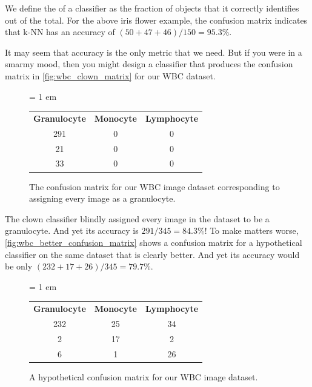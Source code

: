 \begin{note}\end{note}

We define the  of a classifier as the fraction of objects that it correctly identifies out of the total. For the above iris flower example, the confusion matrix indicates that k-NN has an accuracy of $(50 + 47 + 46)/150 = 95.3\%$.

It may seem that accuracy is the only metric that we need. But if you were in a smarmy mood, then you might design a classifier that produces the confusion matrix in \autoref{fig:wbc_clown_matrix} for our WBC dataset.\\

\begin{figure}[h]
\centering
\tabcolsep = 1 em
\mySfFamily
{}
\begin{tabular}{c c c}
\rowcolor{gray!50}
\textbf{Granulocyte} & \textbf{Monocyte} & \textbf{Lymphocyte} \\
291 & 0 & 0 \\
21 & 0 & 0 \\
33 & 0 & 0
\end{tabular}
\caption{The confusion matrix for our WBC image dataset corresponding to assigning every image as a granulocyte.}
\label{fig:wbc_clown_matrix}
\end{figure}

\begin{qbox}\end{qbox}

The clown classifier blindly assigned every image in the dataset to be a granulocyte. And yet its accuracy is $291/345 = 84.3\%$! To make matters worse, \autoref{fig:wbc_better_confusion_matrix} shows a confusion matrix for a hypothetical classifier on the same dataset that is clearly better. And yet its accuracy would be only $(232 + 17 + 26)/345 = 79.7\%$.\\

\begin{figure}[h]
\centering
\tabcolsep = 1 em
\mySfFamily
{}
\begin{tabular}{c c c}
\rowcolor{gray!50}
\textbf{Granulocyte} & \textbf{Monocyte} & \textbf{Lymphocyte} \\
232 & 25 & 34 \\
2 & 17 & 2 \\
6 & 1 & 26
\end{tabular}
\caption{A hypothetical confusion matrix for our WBC image dataset.}
\label{fig:wbc_better_confusion_matrix}
\end{figure}


